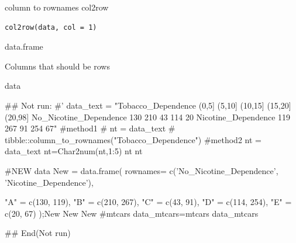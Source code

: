 \documentclass[a4paper]{book}
\begin{document}
%
\begin{Description}
column to rownames col2row
\end{Description}
%
\begin{Usage}
\begin{verbatim}
col2row(data, col = 1)
\end{verbatim}
\end{Usage}
%
\begin{Arguments}
\begin{ldescription}
\item[\code{data}] data.frame

\item[\code{col}] Columns that should be rows
\end{ldescription}
\end{Arguments}
%
\begin{Value}
data
\end{Value}
%
\begin{Examples}
\begin{ExampleCode}

\#\# Not run: 
#'
data_text = "Tobacco_Dependence (0,5] (5,10] (10,15] (15,20] (20,98]
No_Nicotine_Dependence 130 210 43 114 20
Nicotine_Dependence 119 267 91 254 67"
#method1
# nt = data_text%
#         tibble::column_to_rownames("Tobacco_Dependence")
#method2
nt = data_text%
nt=Char2num(nt,1:5)
nt
nt %

#NEW data
New = data.frame(
  rownames= c('No_Nicotine_Dependence', 'Nicotine_Dependence'),

  "A" = c(130, 119),
  "B" = c(210, 267),
  "C" = c(43, 91),
  "D" = c(114, 254),
  "E" = c(20, 67)
);New
New%
New%
#mtcars
data_mtcars=mtcars%
data_mtcars%




## End(Not run)


\end{ExampleCode}
\end{Examples}
\end{document}
